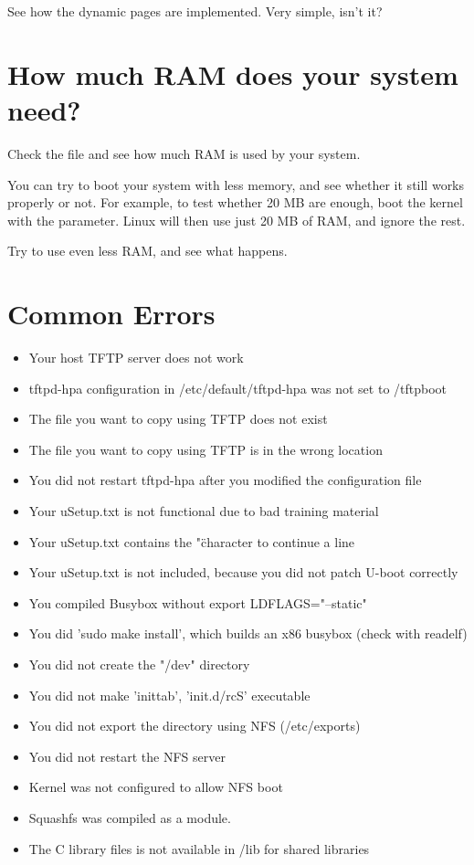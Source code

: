See how the dynamic pages are implemented. Very simple, isn't it?

\section{How much RAM does your system need?}

Check the  file and see how much RAM is used by your
system.

You can try to boot your system with less memory, and see whether it
still works properly or not. For example, to test whether 20 MB are
enough, boot the kernel with the  parameter. Linux will then
use just 20 MB of RAM, and ignore the rest.

Try to use even less RAM, and see what happens.

\section{Common Errors}
\begin{itemize}
\item Your host TFTP server does not work
\item tftpd-hpa configuration in /etc/default/tftpd-hpa was not set to /tftpboot
\item The file you want to copy using TFTP does not exist
\item The file you want to copy using TFTP is in the wrong location
\item You did not restart tftpd-hpa after you modified the configuration file
\item Your uSetup.txt is not functional due to bad training material
\item Your uSetup.txt contains the "\" character to continue a line
\item Your uSetup.txt is not included, because you did not patch U-boot correctly
\item You compiled Busybox without export LDFLAGS="--static"
\item You did 'sudo make install', which builds an x86 busybox (check with readelf)
\item You did not create the "/dev" directory
\item You did not make 'inittab', 'init.d/rcS' executable
\item You did not export the directory using NFS (/etc/exports)
\item You did not restart the NFS server
\item Kernel was not configured to allow NFS boot
\item Squashfs was compiled as a module.
\item The C library files is not available in /lib for shared libraries
\end{itemize}

